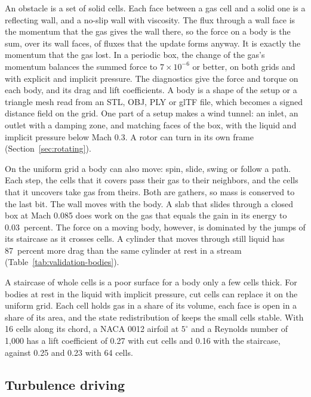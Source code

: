 \documentclass[twocolumn]{aastex701}
\begin{document}
An obstacle is a set of solid cells. Each face between a gas cell and a solid one is a reflecting wall, and a no-slip wall with viscosity. The flux through a wall face is the momentum that the gas gives the wall there, so the force on a body is the sum, over its wall faces, of fluxes that the update forms anyway. It is exactly the momentum that the gas lost. In a periodic box, the change of the gas's momentum balances the summed force to $7\times10^{-6}$ or better, on both grids and with explicit and implicit pressure. The diagnostics give the force and torque on each body, and its drag and lift coefficients. A body is a shape of the setup or a triangle mesh read from an STL, OBJ, PLY or glTF file, which becomes a signed distance field on the grid. One part of a setup makes a wind tunnel: an inlet, an outlet with a damping zone, and matching faces of the box, with the liquid and implicit pressure below Mach 0.3. A rotor can turn in its own frame (Section~\ref{sec:rotating}).

On the uniform grid a body can also move: spin, slide, swing or follow a path. Each step, the cells that it covers pass their gas to their neighbors, and the cells that it uncovers take gas from theirs. Both are gathers, so mass is conserved to the last bit. The wall moves with the body. A slab that slides through a closed box at Mach 0.085 does work on the gas that equals the gain in its energy to 0.03~percent. The force on a moving body, however, is dominated by the jumps of its staircase as it crosses cells. A cylinder that moves through still liquid has 87~percent more drag than the same cylinder at rest in a stream (Table~\ref{tab:validation-bodies}).

A staircase of whole cells is a poor surface for a body only a few cells thick. For bodies at rest in the liquid with implicit pressure, cut cells can replace it on the uniform grid. Each cell holds gas in a share of its volume, each face is open in a share of its area, and the state redistribution of \citet{BergerGiuliani2021} keeps the small cells stable. With 16 cells along its chord, a NACA 0012 airfoil at $5^\circ$ and a Reynolds number of 1,000 has a lift coefficient of 0.27 with cut cells and 0.16 with the staircase, against 0.25 and 0.23 with 64 cells.

\subsection{Turbulence driving}
\label{sec:driving}
\end{document}
